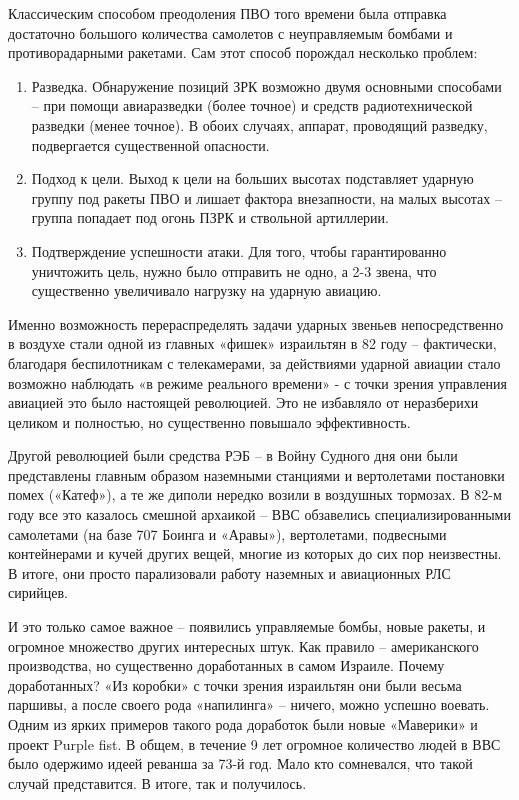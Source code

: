 Классическим способом преодоления ПВО того времени была отправка достаточно большого количества самолетов с неуправляемым бомбами и противорадарными ракетами. Сам этот способ порождал несколько проблем:
\begin{enumerate}
	\item Разведка. Обнаружение позиций ЗРК возможно двумя основными способами – при помощи авиаразведки (более точное) и средств радиотехнической разведки (менее точное). В обоих случаях, аппарат, проводящий разведку, подвергается существенной опасности.
	\item Подход к цели. Выход к цели на больших высотах подставляет ударную группу под ракеты ПВО и лишает фактора внезапности, на малых высотах – группа попадает под огонь ПЗРК и ствольной артиллерии.
	\item Подтверждение успешности атаки. Для того, чтобы гарантированно уничтожить цель, нужно было отправить не одно, а 2-3 звена, что существенно увеличивало нагрузку на ударную авиацию.
\end{enumerate}

Именно возможность перераспределять задачи ударных звеньев непосредственно в воздухе стали одной из главных «фишек» израильтян в 82 году – фактически, благодаря беспилотникам с телекамерами, за действиями ударной авиации стало возможно наблюдать «в режиме реального времени» - с точки зрения управления авиацией это было настоящей революцией. Это не избавляло от неразберихи целиком и полностью, но существенно повышало эффективность.

Другой революцией были средства РЭБ – в Войну Судного дня они были представлены главным образом наземными станциями и вертолетами постановки помех («Катеф»), а те же диполи нередко возили в воздушных тормозах. В 82-м году все это казалось смешной архаикой – ВВС обзавелись специализированными самолетами (на базе 707 Боинга и «Аравы»), вертолетами, подвесными контейнерами и кучей других вещей, многие из которых до сих пор неизвестны. В итоге, они просто парализовали работу наземных и авиационных РЛС сирийцев.

И это только самое важное – появились управляемые бомбы, новые ракеты, и огромное множество других интересных штук. Как правило – американского производства, но существенно доработанных в самом Израиле. Почему доработанных? «Из коробки» с точки зрения израильтян они были весьма паршивы, а после своего рода «напилинга» – ничего, можно успешно воевать. Одним из ярких примеров такого рода доработок были новые «Маверики» и проект Purple fist. В общем, в течение 9 лет огромное количество людей в ВВС было одержимо идеей реванша за 73-й год. Мало кто сомневался, что такой случай представится. В итоге, так и получилось.

